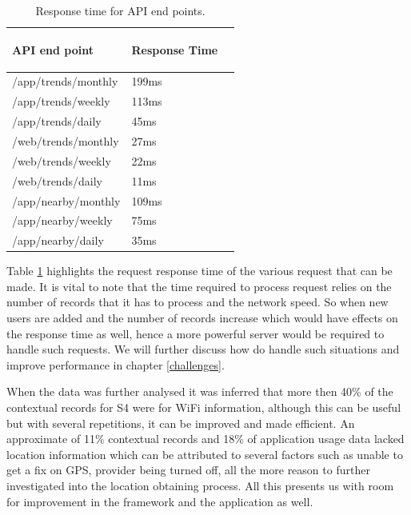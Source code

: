 \documentclass[12pt]{report}
\begin{document}
\begin{table}[htdp]

\begin{center}
\begin{tabularx}{\textwidth}{ XXX }
 
  \begin{center}\textbf{API end point}\end{center} & \begin{center}\textbf{Response Time}\end{center} \\
   \hline
  /app/trends/monthly  & 199ms  \\
  /app/trends/weekly   & 113ms  \\
  /app/trends/daily   &  45ms    \\ 
  /web/trends/monthly  & 27ms  \\
  /web/trends/weekly   & 22ms  \\
  /web/trends/daily   &  11ms    \\ 
    /app/nearby/monthly  & 109ms  \\
  /app/nearby/weekly   & 75ms  \\
  /app/nearby/daily   &  35ms    \\ 
   \hline
  \end{tabularx}

\end{center}
\caption{Response time for API end points.}
\label{timingcomparison}
\end{table}%

Table \ref{timingcomparison} highlights the request response time of the various request that can be made. It is vital to note that the time required to process request relies on the number of records that it has to process and the network speed. So when new users are added and the number of records increase which would have effects on the response time as well, hence a more powerful server would be required to handle such requests. We will further discuss how do handle such situations and improve performance in chapter \ref{challenges}.

When the data was further analysed it was inferred that more then 40\% of the contextual records for S4 were for WiFi information, although this can be useful but with several repetitions, it can be improved and made efficient. An approximate of 11\% contextual records and 18\% of application usage data lacked location information which can be attributed to several factors such as unable to get a fix on GPS, provider being turned off, all the more reason to further investigated into the location obtaining process. All this presents us with room for improvement in the framework and the application as well.
\end{document}
